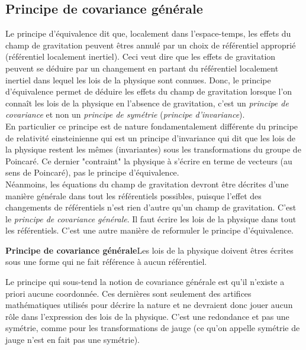 \documentclass[a4paper,11pt]{report}
\theoremstyle{definition}
\theoremstyle{plain}
\theoremstyle{definition}
\theoremstyle{remark}
\begin{document}
        \subsection{Principe de covariance générale}
        
            Le principe d'équivalence dit que, localement dans l'espace-temps, les effets du champ de gravitation peuvent êtres annulé par un choix de référentiel approprié (référentiel localement inertiel). Ceci veut dire que les effets de gravitation peuvent se déduire par un changement en partant du référentiel localement inertiel dans lequel les lois de la physique sont connues. Donc, le principe d'équivalence permet de déduire les effets du champ de gravitation lorsque l'on connaît les lois de la physique en l'absence de gravitation, c'est un \textit{principe de covariance} et non un \textit{principe de symétrie} (\textit{principe d'invariance}).\\
            
            En particulier ce principe est de nature fondamentalement différente du principe de relativité einsteinienne qui est un principe d'invariance qui dit que les lois de la physique restent les mêmes (invariantes) sous les transformations du groupe de Poincaré. Ce dernier "contraint" la physique à s'écrire en terme de vecteurs (au sens de Poincaré), pas le principe d'équivalence.\\
            
            Néanmoins, les équations du champ de gravitation devront être décrites d'une manière générale dans tout les référentiels possibles, puisque l'effet des changements de référentiels n'est rien d'autre qu'un champ de gravitation. C'est le \textit{principe de covariance générale}. Il faut écrire les lois de la physique dans tout les référentiels. C'est une autre manière de reformuler le principe d'équivalence.
            
            \begin{leftbar}
            \textbf{Principe de covariance générale}\quad Les lois de la physique doivent êtres écrites sous une forme qui ne fait référence à aucun référentiel.
            \end{leftbar}
            
            Le principe qui sous-tend la notion de covariance générale est qu'il n'existe a priori aucune coordonnée. Ces dernières sont seulement des artifices mathématiques utilisés pour décrire la nature et ne devraient donc jouer aucun rôle dans l'expression des lois de la physique. C'est une redondance et pas une symétrie, comme pour les transformations de jauge (ce qu'on appelle symétrie de jauge n'est en fait pas une symétrie).
    
\end{document}
